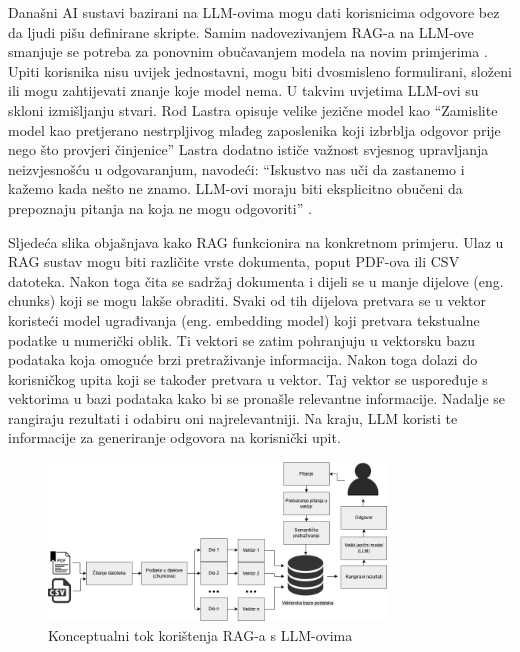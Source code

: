 \documentclass[]{foi}
\begin{document}
Današni AI sustavi bazirani na LLM-ovima mogu dati korisnicima odgovore bez da ljudi pišu definirane skripte. Samim nadovezivanjem RAG-a na LLM-ove smanjuje se potreba za ponovnim obučavanjem 
modela na novim primjerima \cite{ibmRAG}. Upiti korisnika nisu uvijek jednostavni, mogu biti dvosmisleno formulirani, složeni ili mogu zahtijevati znanje koje model nema. U takvim uvjetima 
LLM-ovi su skloni izmišljanju stvari. Rod Lastra opisuje velike jezične model kao “Zamislite model kao pretjerano nestrpljivog mlađeg zaposlenika koji izbrblja odgovor prije nego što provjeri činjenice”
Lastra dodatno ističe važnost svjesnog upravljanja neizvjesnošću u odgovaranjum, navodeći: “Iskustvo nas uči da zastanemo i kažemo kada nešto ne znamo. LLM-ovi moraju biti eksplicitno obučeni da prepoznaju pitanja na koja ne mogu odgovoriti” \cite{ibmRAG}. 

Sljedeća slika objašnjava kako RAG funkcionira na konkretnom primjeru. Ulaz u RAG sustav mogu biti različite vrste dokumenta, poput PDF-ova ili CSV datoteka. Nakon toga čita se 
sadržaj dokumenta i dijeli se u manje dijelove (eng. chunks) koji se mogu lakše obraditi. Svaki od tih dijelova pretvara se u vektor koristeći model ugrađivanja (eng. embedding model)
koji pretvara tekstualne podatke u numerički oblik. Ti vektori se zatim pohranjuju u vektorsku bazu podataka koja omoguće brzi pretraživanje informacija. Nakon toga dolazi do korisničkog
upita koji se također pretvara u vektor. Taj vektor se uspoređuje s vektorima u bazi podataka kako bi se pronašle relevantne informacije. Nadalje se rangiraju rezultati i odabiru oni
najrelevantniji. Na kraju, LLM koristi te informacije za generiranje odgovora na korisnički upit.

\begin{figure}[ht!]
    \centering
    \includegraphics[width=0.8\textwidth]{./assets/rag_diagram.png} 
    \caption{Konceptualni tok korištenja RAG-a s LLM-ovima \cite{awsRAG2025}}
    \label{fig:slika1}
\end{figure}
\end{document}
